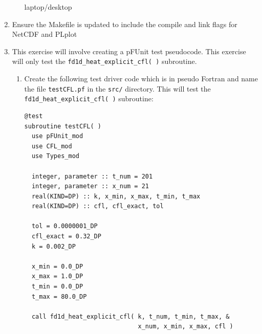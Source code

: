 \documentclass[12pt]{article}
\begin{document}
\begin{enumerate}
\begin{enumerate}
laptop/desktop
\end{enumerate}
\item Ensure the Makefile is updated to include the compile and link flags for NetCDF and PLplot
\item This exercise will involve creating a pFUnit test pseudocode. This exercise will only
test the \texttt{fd1d\_heat\_explicit\_cfl( )} subroutine. 
\begin{enumerate}
\item Create the following test driver code which is in pseudo Fortran and name the file \texttt{testCFL.pf}
  in the \texttt{src/} directory. This will test the \texttt{fd1d\_heat\_explicit\_cfl( )} subroutine:
\begin{verbatim}
@test
subroutine testCFL( )
  use pFUnit_mod
  use CFL_mod
  use Types_mod

  integer, parameter :: t_num = 201
  integer, parameter :: x_num = 21
  real(KIND=DP) :: k, x_min, x_max, t_min, t_max 
  real(KIND=DP) :: cfl, cfl_exact, tol

  tol = 0.0000001_DP
  cfl_exact = 0.32_DP
  k = 0.002_DP

  x_min = 0.0_DP
  x_max = 1.0_DP
  t_min = 0.0_DP
  t_max = 80.0_DP
  
  call fd1d_heat_explicit_cfl( k, t_num, t_min, t_max, &
                               x_num, x_min, x_max, cfl )


\end{verbatim}
\end{enumerate}
\end{enumerate}
\end{document}
